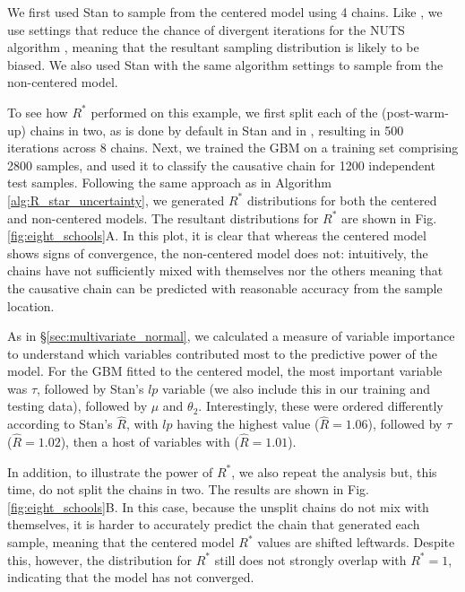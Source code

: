 \documentclass{article}
\begin{document}
We first used Stan \cite{carpenter2017stan} to sample from the centered model using 4 chains. Like \cite{vehtari2019rank}, we use settings that reduce the chance of divergent iterations for the NUTS algorithm \cite{hoffman2014no}, meaning that the resultant sampling distribution is likely to be biased. We also used Stan with the same algorithm settings to sample from the non-centered model.

To see how $R^*$ performed on this example, we first split each of the (post-warm-up) chains in two, as is done by default in Stan \cite{carpenter2017stan} and in \cite{vehtari2019rank}, resulting in 500 iterations across 8 chains. Next, we trained the GBM on a training set comprising 2800 samples, and used it to classify the causative chain for 1200 independent test samples. Following the same approach as in Algorithm \ref{alg:R_star_uncertainty}, we generated $R^*$ distributions for both the centered and non-centered models. The resultant distributions for $R^*$ are shown in Fig.\ref{fig:eight_schools}A. In this plot, it is clear that whereas the centered model shows signs of convergence, the non-centered model does not: intuitively, the chains have not sufficiently mixed with themselves nor the others meaning that the causative chain can be predicted with reasonable accuracy from the sample location.

As in \S\ref{sec:multivariate_normal}, we calculated a measure of variable importance to understand which variables contributed most to the predictive power of the model. For the GBM fitted to the centered model, the most important variable was $\tau$, followed by Stan's $lp$ variable (we also include this in our training and testing data), followed by $\mu$ and $\theta_2$. Interestingly, these were ordered differently according to Stan's $\hat{R}$, with $lp$ having the highest value ($\hat R = 1.06$), followed by $\tau$ ($\hat R = 1.02$), then a host of variables with ($\hat R = 1.01$).

In addition, to illustrate the power of $R^*$, we also repeat the analysis but, this time, do not split the chains in two. The results are shown in Fig.\ref{fig:eight_schools}B. In this case, because the unsplit chains do not mix with themselves, it is harder to accurately predict the chain that generated each sample, meaning that the centered model $R^*$ values are shifted leftwards. Despite this, however, the distribution for $R^*$ still does not strongly overlap with $R^*=1$, indicating that the model has not converged.
\end{document}
